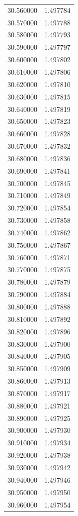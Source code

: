 \begin{tabular}{rr}
30.560000 & 1.497784 \\
30.570000 & 1.497788 \\
30.580000 & 1.497793 \\
30.590000 & 1.497797 \\
30.600000 & 1.497802 \\
30.610000 & 1.497806 \\
30.620000 & 1.497810 \\
30.630000 & 1.497815 \\
30.640000 & 1.497819 \\
30.650000 & 1.497823 \\
30.660000 & 1.497828 \\
30.670000 & 1.497832 \\
30.680000 & 1.497836 \\
30.690000 & 1.497841 \\
30.700000 & 1.497845 \\
30.710000 & 1.497849 \\
30.720000 & 1.497854 \\
30.730000 & 1.497858 \\
30.740000 & 1.497862 \\
30.750000 & 1.497867 \\
30.760000 & 1.497871 \\
30.770000 & 1.497875 \\
30.780000 & 1.497879 \\
30.790000 & 1.497884 \\
30.800000 & 1.497888 \\
30.810000 & 1.497892 \\
30.820000 & 1.497896 \\
30.830000 & 1.497900 \\
30.840000 & 1.497905 \\
30.850000 & 1.497909 \\
30.860000 & 1.497913 \\
30.870000 & 1.497917 \\
30.880000 & 1.497921 \\
30.890000 & 1.497925 \\
30.900000 & 1.497930 \\
30.910000 & 1.497934 \\
30.920000 & 1.497938 \\
30.930000 & 1.497942 \\
30.940000 & 1.497946 \\
30.950000 & 1.497950 \\
30.960000 & 1.497954 \\

\end{tabular}

